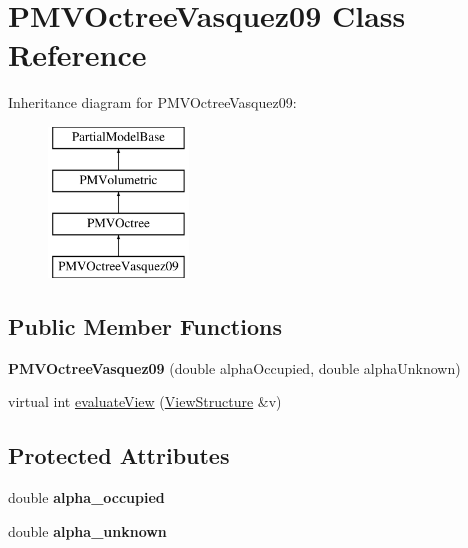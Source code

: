 \hypertarget{classPMVOctreeVasquez09}{}\section{P\+M\+V\+Octree\+Vasquez09 Class Reference}
\label{classPMVOctreeVasquez09}
Inheritance diagram for P\+M\+V\+Octree\+Vasquez09\+:\begin{figure}[H]
\begin{center}
\leavevmode
\includegraphics[height=4.000000cm]{classPMVOctreeVasquez09}
\end{center}
\end{figure}
\subsection*{Public Member Functions}
\begin{DoxyCompactItemize}
\item 
{\bfseries P\+M\+V\+Octree\+Vasquez09} (double alpha\+Occupied, double alpha\+Unknown)\hypertarget{classPMVOctreeVasquez09_a02767ba91cadb9e4f5ebb18697835af9}{}\label{classPMVOctreeVasquez09_a02767ba91cadb9e4f5ebb18697835af9}

\item 
virtual int \hyperlink{classPMVOctreeVasquez09_accb4475c4387147aed552e9dc1172377}{evaluate\+View} (\hyperlink{classViewStructure}{View\+Structure} \&v)
\end{DoxyCompactItemize}
\subsection*{Protected Attributes}
\begin{DoxyCompactItemize}
\item 
double {\bfseries alpha\+\_\+occupied}\hypertarget{classPMVOctreeVasquez09_ac107af7f792a5b0b4d81400a57c3af7c}{}\label{classPMVOctreeVasquez09_ac107af7f792a5b0b4d81400a57c3af7c}

\item 
double {\bfseries alpha\+\_\+unknown}\hypertarget{classPMVOctreeVasquez09_a4e6610193639eeee015d7019e1805874}{}\label{classPMVOctreeVasquez09_a4e6610193639eeee015d7019e1805874}

\end{DoxyCompactItemize}
